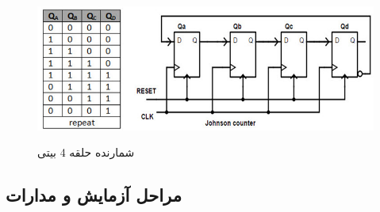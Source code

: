 \documentclass[twoside]{article}
\begin{document}
	\begin{figure}[h!]
	\begin{center}
		\includegraphics[scale=0.6]{johnson_ring_counter}‎
		\caption{شمارنده حلقه 4 بیتی}
	\end{center}
\end{figure} 

	\subsection*{مراحل آزمایش و مدارات}
\end{document}

